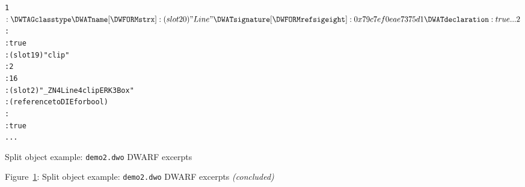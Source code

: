 \begin{figure}[b]
\begin{dwflisting}
\begin{alltt}

1$: \DWTAGclasstype
        \DWATname [\DWFORMstrx]: (slot 20) "Line"
        \DWATsignature [\DWFORMrefsigeight]: 0x79c7ef0eae7375d1
        \DWATdeclaration: true
    ...
2$:   \DWTAGsubprogram
          \DWATexternal: true
          \DWATname [\DWFORMstrx]: (slot 19) "clip"
          \DWATdeclfile: 2
          \DWATdeclline: 16
          \DWATlinkagename [\DWFORMstrx]: (slot 2) "_ZN4Line4clipERK3Box"
          \DWATtype: (reference to DIE for bool)
          \DWATaccessibility: \DWACCESSpublic
          \DWATdeclaration: true
      ...
\end{alltt}
\end{dwflisting}
\caption{Split object example: \texttt{demo2.dwo} DWARF \dotdebuginfodwo{} excerpts}
\label{fig:splitobjectexampledemo2dwodwarfdebuginfodwoexcerpts}
\end{figure}

\begin{figure}
\begin{center}
\vspace{3mm}
Figure~\ref{fig:splitobjectexampledemo2dwodwarfdebuginfodwoexcerpts}: Split object example: \texttt{demo2.dwo} DWARF \dotdebuginfodwo{} excerpts \textit{(concluded)}
\end{center}
\end{figure}

